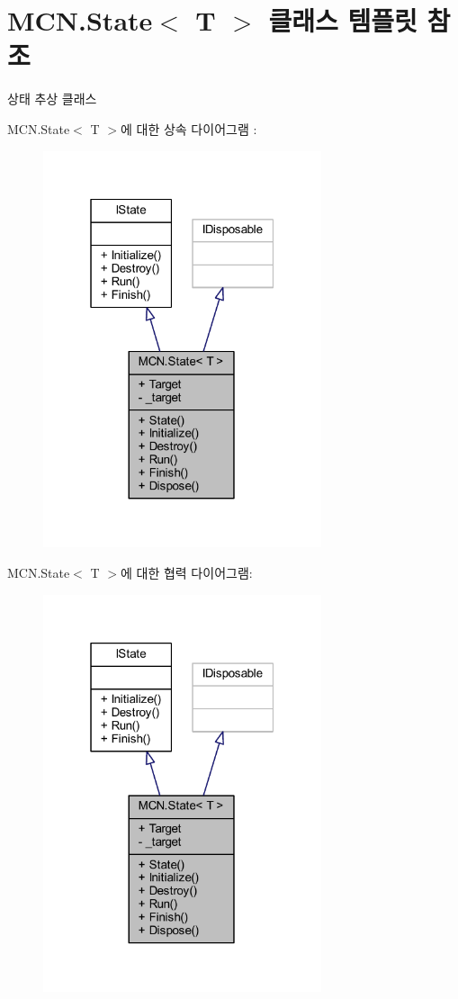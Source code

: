 \hypertarget{class_m_c_n_1_1_state}{}\section{M\+C\+N.\+State$<$ T $>$ 클래스 템플릿 참조}
\label{class_m_c_n_1_1_state}


상태 추상 클래스  




M\+C\+N.\+State$<$ T $>$에 대한 상속 다이어그램 \+: \nopagebreak
\begin{figure}[H]
\begin{center}
\leavevmode
\includegraphics[width=232pt]{class_m_c_n_1_1_state__inherit__graph}
\end{center}
\end{figure}


M\+C\+N.\+State$<$ T $>$에 대한 협력 다이어그램\+:\nopagebreak
\begin{figure}[H]
\begin{center}
\leavevmode
\includegraphics[width=232pt]{class_m_c_n_1_1_state__coll__graph}
\end{center}
\end{figure}
